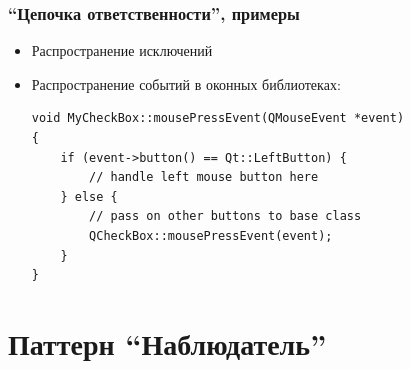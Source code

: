 \documentclass[xetex,mathserif,serif]{beamer}
\begin{document}
	\begin{frame}[fragile]
		\frametitle{``Цепочка ответственности'', примеры}
		\begin{itemize}
			\item Распространение исключений
			\item Распространение событий в оконных библиотеках:
			\begin{verbatim}
void MyCheckBox::mousePressEvent(QMouseEvent *event)
{
    if (event->button() == Qt::LeftButton) {
        // handle left mouse button here
    } else {
        // pass on other buttons to base class
        QCheckBox::mousePressEvent(event);
    }
}
			\end{verbatim}
		\end{itemize}
	\end{frame}

	\section{Паттерн ``Наблюдатель''}
\end{document}
